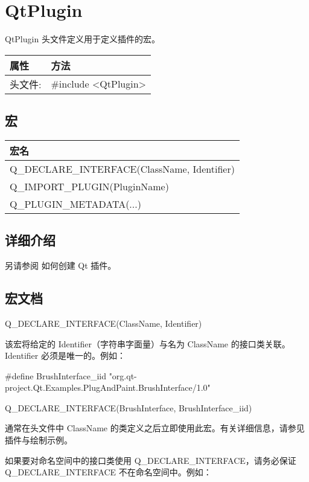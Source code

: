 \chapter{QtPlugin}

QtPlugin 头文件定义用于定义插件的宏。

\begin{tabular}{|l|l|}
\hline
属性 &	方法\\
\hline
头文件:& 	\#include <QtPlugin>\\
\hline
\end{tabular}

\section{宏}

\begin{tabular}{|l|}
\hline
宏名 \\
\hline
Q\_DECLARE\_INTERFACE(ClassName, Identifier) \\ 
\hline
Q\_IMPORT\_PLUGIN(PluginName) \\ 
\hline
Q\_PLUGIN\_METADATA(...) \\
\hline
\end{tabular}





\section{详细介绍}
另请参阅 如何创建 Qt 插件。

\section{宏文档}

Q\_DECLARE\_INTERFACE(ClassName, Identifier)

该宏将给定的 Identifier（字符串字面量）与名为 ClassName 的接口类关联。
Identifier 必须是唯一的。例如：

\begin{cppcode}
#define BrushInterface_iid "org.qt-project.Qt.Examples.PlugAndPaint.BrushInterface/1.0"

Q_DECLARE_INTERFACE(BrushInterface, BrushInterface_iid)
\end{cppcode}

通常在头文件中 ClassName 的类定义之后立即使用此宏。有关详细信息，请参见插件与绘制示例。

如果要对命名空间中的接口类使用 Q\_DECLARE\_INTERFACE，请务必保证 Q\_DECLARE\_INTERFACE 不在命名空间中。例如：

